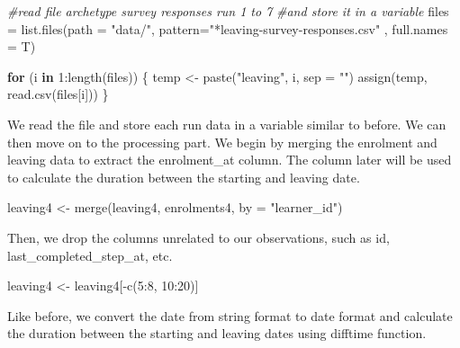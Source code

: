 \documentclass[12pt,]{article}
\newenvironment{Shaded}{\begin{snugshade}}{\end{snugshade}}
\newcommand{\AttributeTok}[1]{\textcolor[rgb]{0.77,0.63,0.00}{#1}}
\newcommand{\CommentTok}[1]{\textcolor[rgb]{0.56,0.35,0.01}{\textit{#1}}}
\newcommand{\ControlFlowTok}[1]{\textcolor[rgb]{0.13,0.29,0.53}{\textbf{#1}}}
\newcommand{\DecValTok}[1]{\textcolor[rgb]{0.00,0.00,0.81}{#1}}
\newcommand{\FunctionTok}[1]{\textcolor[rgb]{0.00,0.00,0.00}{#1}}
\newcommand{\NormalTok}[1]{#1}
\newcommand{\OtherTok}[1]{\textcolor[rgb]{0.56,0.35,0.01}{#1}}
\newcommand{\SpecialCharTok}[1]{\textcolor[rgb]{0.00,0.00,0.00}{#1}}
\newcommand{\StringTok}[1]{\textcolor[rgb]{0.31,0.60,0.02}{#1}}
\begin{document}
\begin{Shaded}
\begin{Highlighting}[]
\CommentTok{\#read file archetype survey responses run 1 to 7 }
\CommentTok{\#and store it in a variable}
\NormalTok{files }\OtherTok{=} \FunctionTok{list.files}\NormalTok{(}\AttributeTok{path =} \StringTok{"data/"}\NormalTok{, }
                   \AttributeTok{pattern=}\StringTok{"*leaving{-}survey{-}responses.csv"}
\NormalTok{                   , }\AttributeTok{full.names =}\NormalTok{ T)}

\ControlFlowTok{for}\NormalTok{ (i }\ControlFlowTok{in} \DecValTok{1}\SpecialCharTok{:}\FunctionTok{length}\NormalTok{(files)) \{}
\NormalTok{  temp }\OtherTok{\textless{}{-}} \FunctionTok{paste}\NormalTok{(}\StringTok{"leaving"}\NormalTok{, i, }\AttributeTok{sep =} \StringTok{""}\NormalTok{)}
  \FunctionTok{assign}\NormalTok{(temp, }\FunctionTok{read.csv}\NormalTok{(files[i]))}
\NormalTok{\}}
\end{Highlighting}
\end{Shaded}

We read the file and store each run data in a variable similar to
before. We can then move on to the processing part. We begin by merging
the enrolment and leaving data to extract the enrolment\_at column. The
column later will be used to calculate the duration between the starting
and leaving date.

\begin{Shaded}
\begin{Highlighting}[]
\NormalTok{leaving4 }\OtherTok{\textless{}{-}} \FunctionTok{merge}\NormalTok{(leaving4, enrolments4, }\AttributeTok{by =} \StringTok{"learner\_id"}\NormalTok{)}
\end{Highlighting}
\end{Shaded}

Then, we drop the columns unrelated to our observations, such as id,
last\_completed\_step\_at, etc.

\begin{Shaded}
\begin{Highlighting}[]
\NormalTok{leaving4 }\OtherTok{\textless{}{-}}\NormalTok{ leaving4[}\SpecialCharTok{{-}}\FunctionTok{c}\NormalTok{(}\DecValTok{5}\SpecialCharTok{:}\DecValTok{8}\NormalTok{, }\DecValTok{10}\SpecialCharTok{:}\DecValTok{20}\NormalTok{)]}
\end{Highlighting}
\end{Shaded}

Like before, we convert the date from string format to date format and
calculate the duration between the starting and leaving dates using
difftime function.
\end{document}
